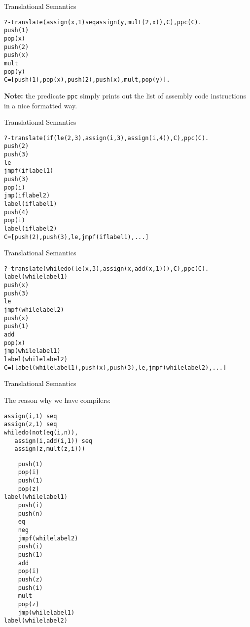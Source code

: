 \documentclass{beamer}
\begin{document}
\begin{frame}[fragile]{Translational Semantics}

\scriptsize
\begin{alltt}
?- translate(assign(x,1) seq assign(y,mult(2,x)),C),ppc(C).
    push(1)
    pop(x)
    push(2)
    push(x)
    mult
    pop(y)
C = [push(1), pop(x), push(2), push(x), mult, pop(y)].
\end{alltt}

{\bf Note:} the predicate {\tt ppc} simply prints out the list of assembly code instructions in a nice
formatted way.
\end{frame}

\begin{frame}[fragile]{Translational Semantics}

\scriptsize

\begin{alltt}
?- translate(if(le(2,3),assign(i,3),assign(i,4)),C),ppc(C).
    push(2)
    push(3)
    le
    jmpf(iflabel1)
    push(3)
    pop(i)
    jmp(iflabel2)
label(iflabel1)
    push(4)
    pop(i)
label(iflabel2)
C = [push(2), push(3), le, jmpf(iflabel1), ...]
\end{alltt}


\end{frame}

\begin{frame}[fragile]{Translational Semantics}

\scriptsize

\begin{alltt}
?- translate(whiledo(le(x,3),assign(x,add(x,1))),C),ppc(C).
label(whilelabel1)
    push(x)
    push(3)
    le
    jmpf(whilelabel2)
    push(x)
    push(1)
    add
    pop(x)
    jmp(whilelabel1)
label(whilelabel2)
C = [label(whilelabel1), push(x), push(3), le, jmpf(whilelabel2), ...]
\end{alltt}

\end{frame}

\begin{frame}[fragile]{Translational Semantics}

\scriptsize
The reason why we have compilers:

\tiny
\begin{minipage}[t]{1.9in}
\begin{verbatim}
assign(i,1) seq
assign(z,1) seq
whiledo(not(eq(i,n)),
   assign(i,add(i,1)) seq
   assign(z,mult(z,i)))
\end{verbatim}
\end{minipage}
\begin{minipage}[t]{1.9in}
\begin{verbatim}
    push(1)
    pop(i)
    push(1)
    pop(z)
label(whilelabel1)
    push(i)
    push(n)
    eq
    neg
    jmpf(whilelabel2)
    push(i)
    push(1)
    add
    pop(i)
    push(z)
    push(i)
    mult
    pop(z)
    jmp(whilelabel1)
label(whilelabel2)
\end{verbatim}
\end{minipage}
\end{frame}
\end{document}
